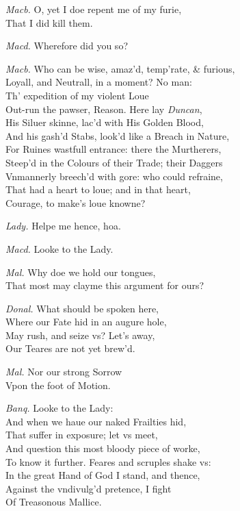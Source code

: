 \documentclass[12pt]{sides}
\newcommand{\dia}[1]{\hskip 15pt\textit{#1}\hskip 6pt}
\begin{document}
\begin{multicols}{2}
            \dia{Macb.} O, yet I doe repent me of my furie, \\ That I did kill them.

            \dia{Macd.} Wherefore did you so?

            \dia{Macb.} Who can be wise, amaz'd, temp'rate, \& furious, \\ Loyall, and Neutrall, in a moment? No man: \\ Th' expedition of my violent Loue \\ Out-run the pawser, Reason. Here lay \textit{Duncan}, \\ His Siluer skinne, lac'd with His Golden Blood, \\ And his gash'd Stabs, look'd like a Breach in Nature, \\ For Ruines wastfull entrance: there the Murtherers, \\ Steep'd in the Colours of their Trade; their Daggers \\ Vnmannerly breech'd with gore: who could refraine, \\ That had a heart to loue; and in that heart, \\ Courage, to make's loue knowne?

            \dia{Lady.} Helpe me hence, hoa.

            \dia{Macd.} Looke to the Lady.

            \dia{Mal.} Why doe we hold our tongues, \\ That most may clayme this argument for ours?

            \dia{Donal.} What should be spoken here, \\ Where our Fate hid in an augure hole, \\ May rush, and seize vs? Let's away, \\ Our Teares are not yet brew'd.

            \dia{Mal.} Nor our strong Sorrow \\ Vpon the foot of Motion.

            \dia{Banq.} Looke to the Lady: \\ And when we haue our naked Frailties hid, \\ That suffer in exposure; let vs meet, \\ And question this most bloody piece of worke, \\ To know it further. Feares and scruples shake vs: \\ In the great Hand of God I stand, and thence, \\ Against the vndivulg'd pretence, I fight \\ Of Treasonous Mallice.


\end{multicols}
\end{document}
